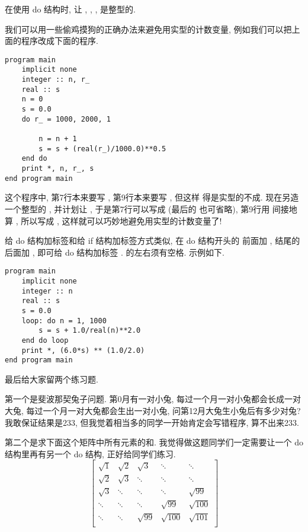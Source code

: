 \begin{convention}
    在使用 do 结构时, 让 \ttt{\emph{[m]}}, \ttt{\emph{[m1]}}, \ttt{\emph{[m2]}}, \ttt{\emph{[m3]}} 是整型的.
\end{convention}

我们可以用一些偷鸡摸狗的正确办法来避免用实型的计数变量, 例如我们可以把上面的程序改成下面的程序.
\begin{lstlisting}
program main
    implicit none
    integer :: n, r_
    real :: s
    n = 0
    s = 0.0
    do r_ = 1000, 2000, 1

        n = n + 1
        s = s + (real(r_)/1000.0)**0.5
    end do
    print *, n, r_, s
end program main
\end{lstlisting}
这个程序中, 第7行本来要写 , 第9行本来要写 , 但这样  得是实型的不成. 现在另造一个整型的 , 并计划让 , 于是第7行可以写成  (最后的  也可省略), 第9行用  间接地算 , 所以写成 , 这样就可以巧妙地避免用实型的计数变量了!

给 do 结构加标签和给 if 结构加标签方式类似, 在 do 结构开头的  前面加 \ttt{[tag]:}, 结尾的  后面加 \ttt{[tag]}, 即可给 do 结构加标签 \ttt{[tag]}.  的左右须有空格. 示例如下.
\begin{lstlisting}
program main
    implicit none
    integer :: n
    real :: s
    s = 0.0
    loop: do n = 1, 1000
        s = s + 1.0/real(n)**2.0
    end do loop
    print *, (6.0*s) ** (1.0/2.0)
end program main
\end{lstlisting}

最后给大家留两个练习题.

第一个是斐波那契兔子问题. 第0月有一对小兔, 每过一个月一对小兔都会长成一对大兔, 每过一个月一对大兔都会生出一对小兔, 问第12月大兔生小兔后有多少对兔? 我敢保证结果是233, 但我觉着相当多的同学一开始肯定会写错程序, 算不出来233.

第二个是求下面这个矩阵中所有元素的和. 我觉得做这题同学们一定需要让一个 do 结构里再有另一个 do 结构, 正好给同学们练习.\label{hw_2}\pagebreak
\begin{equation*}
    \begin{bmatrix}
        \sqrt{1}     &\sqrt{2}     &\sqrt{3}     &\ddots&\ddots\\
        \sqrt{2}     &\sqrt{3}     &\ddots&\ddots&\ddots\\
        \sqrt{3}     &\ddots&\ddots&\ddots&\sqrt{99}    \\
        \ddots&\ddots&\ddots&\sqrt{99}    &\sqrt{100}    \\
        \ddots&\ddots&\sqrt{99}    &\sqrt{100}   &\sqrt{101}   \\
    \end{bmatrix}
\end{equation*}

